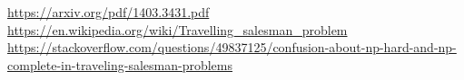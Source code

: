 \begin{thebibliography}    
    \url{https://arxiv.org/pdf/1403.3431.pdf}
    \url{https://en.wikipedia.org/wiki/Travelling_salesman_problem}
    \url{https://stackoverflow.com/questions/49837125/confusion-about-np-hard-and-np-complete-in-traveling-salesman-problems}
\end{thebibliography}
